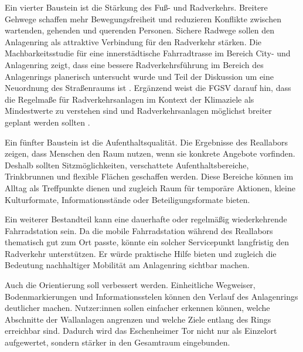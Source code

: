 \documentclass[a4paper,12pt]{article}
\begin{document}
Ein vierter Baustein ist die Stärkung des Fuß- und Radverkehrs. Breitere Gehwege schaffen mehr Bewegungsfreiheit und reduzieren Konflikte zwischen wartenden, gehenden und querenden Personen. Sichere Radwege sollen den Anlagenring als attraktive Verbindung für den Radverkehr stärken. Die Machbarkeitsstudie für eine innerstädtische Fahrradtrasse im Bereich City- und Anlagenring zeigt, dass eine bessere Radverkehrsführung im Bereich des Anlagenrings planerisch untersucht wurde und Teil der Diskussion um eine Neuordnung des Straßenraums ist \autocite{magistratfrankfurtfahrradtrasse2023}. Ergänzend weist die FGSV darauf hin, dass die Regelmaße für Radverkehrsanlagen im Kontext der Klimaziele als Mindestwerte zu verstehen sind und Radverkehrsanlagen möglichst breiter geplant werden sollten \autocite{fgsveklima2022}.

Ein fünfter Baustein ist die Aufenthaltsqualität. Die Ergebnisse des Reallabors zeigen, dass Menschen den Raum nutzen, wenn sie konkrete Angebote vorfinden. Deshalb sollten Sitzmöglichkeiten, verschattete Aufenthaltsbereiche, Trinkbrunnen und flexible Flächen geschaffen werden. Diese Bereiche können im Alltag als Treffpunkte dienen und zugleich Raum für temporäre Aktionen, kleine Kulturformate, Informationsstände oder Beteiligungsformate bieten.

Ein weiterer Bestandteil kann eine dauerhafte oder regelmäßig wiederkehrende Fahrradstation sein. Da die mobile Fahrradstation während des Reallabors thematisch gut zum Ort passte, könnte ein solcher Servicepunkt langfristig den Radverkehr unterstützen. Er würde praktische Hilfe bieten und zugleich die Bedeutung nachhaltiger Mobilität am Anlagenring sichtbar machen.

Auch die Orientierung soll verbessert werden. Einheitliche Wegweiser, Bodenmarkierungen und Informationsstelen können den Verlauf des Anlagenrings deutlicher machen. Nutzer:innen sollen einfacher erkennen können, welche Abschnitte der Wallanlagen angrenzen und welche Ziele entlang des Rings erreichbar sind. Dadurch wird das Eschenheimer Tor nicht nur als Einzelort aufgewertet, sondern stärker in den Gesamtraum eingebunden.
\end{document}
